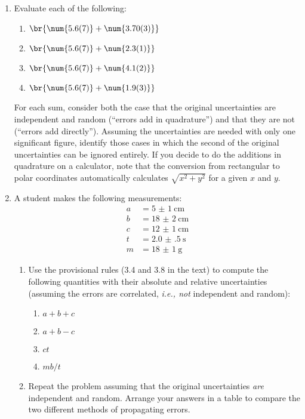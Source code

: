 \documentclass[nobib,nofonts,nols,nohyper]{tufte-handout}
\begin{document}
\begin{enumerate}
	\item{} Evaluate each of the following:
	\begin{enumerate}
		\item \( \br{\num{5.6(7)} + \num{3.70(3)}} \)
		
		\item \( \br{\num{5.6(7)} + \num{2.3(1)}} \)
		
		\item \( \br{\num{5.6(7)} + \num{4.1(2)}} \)
		
		\item \( \br{\num{5.6(7)} + \num{1.9(3)}} \)
	\end{enumerate}
	For each sum, consider both the case that the original uncertainties are independent and random (``errors add in quadrature'') and that they are not (``errors add directly''). 
	Assuming the uncertainties are needed with only one significant figure, identify those cases in which the second of the original uncertainties can be ignored entirely. 
	If you decide to do the additions in quadrature on a calculator, note that the conversion from rectangular to polar coordinates automatically calculates \( \sqrt{x^2 + y^2} \) for a given \( x \) and \( y \). 
	
	\item A student makes the following measurements:
		\begin{align*}
			a &= \SI{5(1)}{\cm} \\
			b &= \SI{18(2)}{\cm} \\
			c &= \SI{12(1)}{\cm} \\
			t &= \SI{2.0(5)}{\s} \\
			m &= \SI{18(1)}{\g} 
		\end{align*}
	\begin{enumerate}
		\item Use the provisional rules (3.4 and 3.8 in the text) to compute the following quantities with their absolute and relative uncertainties (assuming the errors are correlated, \emph{i.e., not} independent and random):
		\begin{enumerate}
			\item \( a + b + c \)
			\item \( a + b - c \)
			\item \( ct \)
			\item \( mb/t \)
		\end{enumerate}
	
		\item Repeat the problem assuming that the original uncertainties \emph{are} independent and random. 
		Arrange your answers in a table to compare the two different methods of propagating errors. 
	\end{enumerate}
	

\end{enumerate}
\end{document}
